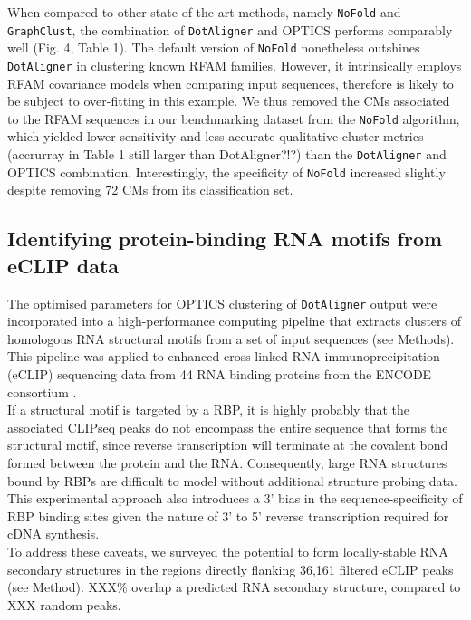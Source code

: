 \documentclass{bmcart}
\newcommand\dotaligner{\texttt{DotAligner}}
\newcommand\nofold{\texttt{NoFold}}
\begin{document}
When compared to other state of the art methods, namely \nofold{} and
\texttt{GraphClust}, the combination of \dotaligner{} and OPTICS performs
comparably well (Fig. 4, Table 1). The default version of \nofold{}
nonetheless outshines \dotaligner{} in clustering known RFAM families. However,
it intrinsically employs RFAM covariance models when comparing input sequences,
therefore is likely to be subject to over-fitting in this example. We thus
removed the CMs associated to the RFAM sequences in our benchmarking dataset
from the \nofold{} algorithm, which yielded lower sensitivity and less
accurate qualitative cluster metrics {\color{red} (accrurray in Table 1 still
larger than DotAligner?!?)} than the \dotaligner{} and OPTICS combination.
Interestingly, the specificity of \nofold{} increased slightly despite
removing 72 CMs from its classification set. 


\subsection*{Identifying protein-binding RNA motifs from eCLIP data}
The optimised parameters for OPTICS clustering of \dotaligner{} output were incorporated into 
a high-performance computing pipeline that extracts clusters of homologous RNA structural motifs from a set of input sequences (see Methods). This pipeline was applied to enhanced cross-linked 
RNA immunoprecipitation (eCLIP) sequencing data from 44 RNA binding proteins from the ENCODE consortium  \cite{van2016robust}.  \\

If a structural motif is targeted by a RBP, it is highly probably that the associated CLIPseq peaks 
do not encompass the entire sequence that forms the structural motif, since 
reverse transcription will terminate at the covalent bond formed between the 
protein and the RNA. Consequently, large RNA structures bound by RBPs are 
difficult to model without additional structure probing data. This experimental 
approach also introduces a 3' bias in the sequence-specificity of RBP binding sites 
given the nature of 3' to 5' reverse transcription required for cDNA synthesis.\\

To address these caveats, we surveyed the potential to form locally-stable
RNA secondary structures in the regions directly flanking 36,161 filtered eCLIP 
peaks (see Method). {\color{red} XXX\% overlap a predicted RNA secondary structure, 
compared to XXX random peaks.} \\
\end{document}
